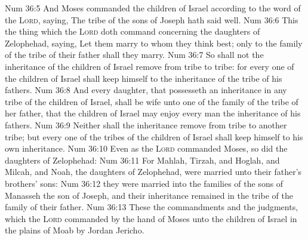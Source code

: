\vs Num 36:5 And Moses commanded the children of Israel according to the word of the \textsc{Lord}, saying, The tribe of the sons of Joseph hath said well.
\vs Num 36:6 This  the thing which the \textsc{Lord} doth command concerning the daughters of Zelophehad, saying, Let them marry to whom they think best; only to the family of the tribe of their father shall they marry.
\vs Num 36:7 So shall not the inheritance of the children of Israel remove from tribe to tribe: for every one of the children of Israel shall keep himself to the inheritance of the tribe of his fathers.
\vs Num 36:8 And every daughter, that possesseth an inheritance in any tribe of the children of Israel, shall be wife unto one of the family of the tribe of her father, that the children of Israel may enjoy every man the inheritance of his fathers.
\vs Num 36:9 Neither shall the inheritance remove from  tribe to another tribe; but every one of the tribes of the children of Israel shall keep himself to his own inheritance.
\vs Num 36:10 Even as the \textsc{Lord} commanded Moses, so did the daughters of Zelophehad:
\vs Num 36:11 For Mahlah, Tirzah, and Hoglah, and Milcah, and Noah, the daughters of Zelophehad, were married unto their father's brothers' sons:
\vs Num 36:12  they were married into the families of the sons of Manasseh the son of Joseph, and their inheritance remained in the tribe of the family of their father.
\vs Num 36:13 These  the commandments and the judgments, which the \textsc{Lord} commanded by the hand of Moses unto the children of Israel in the plains of Moab by Jordan  Jericho.
